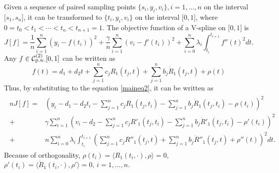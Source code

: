 Given a sequence of paired sampling points $\lbrace s_i,y_i,v_i \rbrace, i=1,\ldots,n$ on the interval $\lbrack s_1,s_n\rbrack$, it can be transformed to $\lbrace t_i,y_i,v_i \rbrace$ on the interval $\lbrack 0,1\rbrack$, where $0=t_0<t_1<\cdots <t_n<t_{n+1}=1$. The objective function of a V-spline on $\lbrack 0,1\rbrack$ is  
\begin{equation}\label{maineq2}
J[f]=\frac{1}{n}\sum_{i=1}^{n}\left(y_i-f(t_i)\right)^2+\frac{\gamma}{n}\sum_{i=1}^{n}\left(v_i-f'(t_i)\right)^2+\sum_{i=0}^{n}\lambda_i\int_{t_i}^{t_{i+1}}f''(t)^2dt.
\end{equation}
Any $f\in\mathcal{C}_{\mbox{\scriptsize p.w.}}^{(2)}[0,1]$ can be written as 
\begin{equation}\label{GaussianProcessFunctionF2}
f(t)=d_1+d_2t+\sum_{j=1}^{n}c_jR_1(t_j,t)+\sum_{j=1}^{n}b_j\dot{R}_1(t_j,t) +\rho(t)
\end{equation}
Thus, by substituting to the equation \eqref{maineq2}, it can be written as 
\begin{align}\label{GassianProcessRawequation2}
\begin{split}
nJ[f]=& \left( y_i - d_1-d_2t_i-\sum_{j=1}^{n}c_jR_1(t_j,t_i)-\sum_{j=1}^{n}b_j\dot{R}_1(t_j,t_i)-\rho(t_i) \right) ^2\\
+&\gamma\sum_{i=1}^{n} \left( v_i - d_2-\sum_{j=1}^{n}c_jR'_1(t_j,t_i)-\sum_{j=1}^{n}b_j\dot{R}'_1(t_j,t_i)-\rho'(t_i) \right) ^2\\
+&n \sum_{i=0}^{n}\lambda_i \int_{t_i}^{t_{i+1}}  \left( \sum_{j=1}^{n}c_jR''_1(t_j,t)+\sum_{j=1}^{n}b_j\dot{R}''_1(t_j,t)+\rho''(t)\right)^2dt. 
\end{split}
\end{align}
Because of orthogonality, $\rho(t_i) = \langle R_1(t_i,\cdot),\rho\rangle=0$, $\rho'(t_i) = \langle \dot{R}_1(t_i,\cdot),\rho'\rangle=0$, $i=1,\ldots,n$. 
